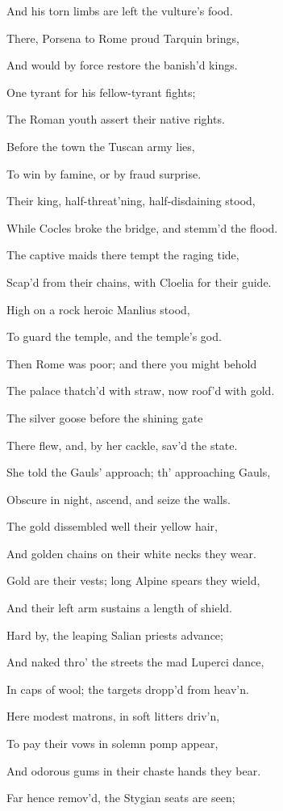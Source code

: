 And his torn limbs are left the vulture’s food.

There, Porsena to Rome proud Tarquin brings,

And would by force restore the banish’d kings.

One tyrant for his fellow-tyrant fights;

The Roman youth assert their native rights.

Before the town the Tuscan army lies,

To win by famine, or by fraud surprise.

Their king, half-threat’ning, half-disdaining stood,

While Cocles broke the bridge, and stemm’d the flood.

The captive maids there tempt the raging tide,

Scap’d from their chains, with Cloelia for their guide.

High on a rock heroic Manlius stood,

To guard the temple, and the temple’s god.

Then Rome was poor; and there you might behold

The palace thatch’d with straw, now roof’d with gold.

The silver goose before the shining gate

There flew, and, by her cackle, sav’d the state.

She told the Gauls’ approach; th’ approaching Gauls,

Obscure in night, ascend, and seize the walls.

The gold dissembled well their yellow hair,

And golden chains on their white necks they wear.

Gold are their vests; long Alpine spears they wield,

And their left arm sustains a length of shield.

Hard by, the leaping Salian priests advance;

And naked thro’ the streets the mad Luperci dance,

In caps of wool; the targets dropp’d from heav’n.

Here modest matrons, in soft litters driv’n,

To pay their vows in solemn pomp appear,

And odorous gums in their chaste hands they bear.

Far hence remov’d, the Stygian seats are seen;

